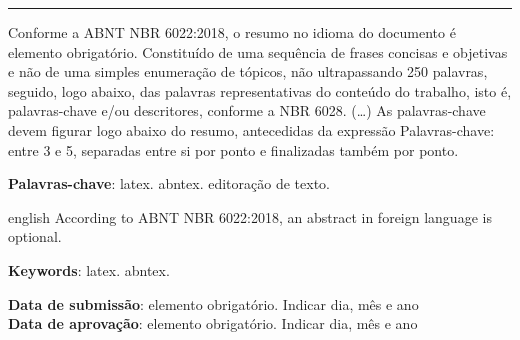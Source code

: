\documentclass[
	article,			%
	12pt,				%
	oneside,			%
	a4paper,			%
	english,			%
	brazil,				%
	sumario=tradicional
]{abntex2}
\begin{document}

\frenchspacing 


\maketitle



\noindent\rule{\textwidth}{1pt}

\begin{resumoumacoluna}
 Conforme a ABNT NBR 6022:2018, o resumo no idioma do documento é elemento obrigatório. Constituído de uma sequência de frases concisas e objetivas e não de uma simples enumeração de tópicos, não ultrapassando 250 palavras, seguido, logo abaixo, das palavras representativas do conteúdo do trabalho, isto é, palavras-chave e/ou descritores, conforme a NBR 6028. (\ldots) As palavras-chave devem figurar logo abaixo do resumo, antecedidas da expressão Palavras-chave: entre 3 e 5, separadas entre si por ponto e finalizadas também por ponto.

 \vspace{\onelineskip}
 
 \noindent
 \textbf{Palavras-chave}: latex. abntex. editoração de texto.
\end{resumoumacoluna}


\renewcommand{\resumoname}{Abstract}
\begin{resumoumacoluna}
 \begin{otherlanguage*}{english}
   According to ABNT NBR 6022:2018, an abstract in foreign language is optional.

   \vspace{\onelineskip}
 
   \noindent
   \textbf{Keywords}: latex. abntex.
 \end{otherlanguage*}  
\end{resumoumacoluna}


\begin{center}\smaller
   \textbf{Data de submissão}: elemento obrigatório. Indicar dia, mês e ano \\
   \textbf{Data de aprovação}: elemento obrigatório. Indicar dia, mês e ano
\end{center}
\end{document}
